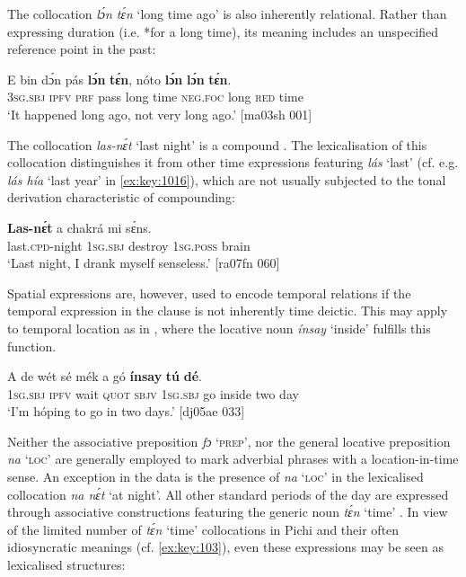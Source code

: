 The collocation \textit{lɔ́n tɛ́n} ‘long time ago’ is also inherently relational. Rather than expressing duration (i.e. *for a long time), its meaning includes an unspecified reference point in the past:



\ea%
    \label{ex:key:1017}
    \gll E    bin  dɔ́n  pás  \textbf{lɔ́n}  \textbf{tɛ́n},    nóto  \textbf{lɔ́n}    \textbf{lɔ́n}  \textbf{tɛ́n}.\\
\textsc{3sg.sbj}  \textsc{ipfv}  \textsc{prf}  pass  long  time    \textsc{neg}.\textsc{foc}  long    \textsc{red}  time\\

\glt ‘It happened long ago, not very long ago.’ [ma03sh 001]
\z

The collocation \textit{las-nɛ́t} ‘last night’ is a compound . The lexicalisation of this collocation distinguishes it from other time expressions featuring \textit{lás} ‘last’ (cf. e.g. \textit{lás hía} ‘last year’ in \ref{ex:key:1016}), which are not usually subjected to the tonal derivation characteristic of compounding{\fff}: 


\ea%
    \label{ex:key:1018}
    \gll \textbf{Las-nɛ́t}    a    chakrá  mi    sɛ́ns.\\
last.\textsc{cpd}{}-night  \textsc{1sg.sbj}  destroy  \textsc{1sg.poss}  brain\\

\glt ‘Last night, I drank myself senseless.’ [ra07fn 060]
\z

Spatial expressions are, however, used to encode temporal relations if the temporal expression in the clause is not inherently time deictic. This may apply to temporal location as in , where the locative noun\textit{ ínsay} ‘inside’ fulfills this function. 


\ea%
    \label{ex:key:1019}
    \gll A    de  wét  sé    mék  a    gó  \textbf{ínsay}  \textbf{tú}  \textbf{dé}.\\
\textsc{1sg.sbj}  \textsc{ipfv}  wait  \textsc{quot}    \textsc{sbjv}  \textsc{1sg.sbj}  go  inside  two  day\\

\glt ‘I’m hóping to go in two days.’ [dj05ae 033]
\z

Neither the associative preposition{\fff} \textit{fɔ} ‘\textsc{prep}’, nor the general locative preposition{\fff} \textit{na} ‘\textsc{loc}’ are generally employed to mark adverbial phrases with a location-in-time sense. An exception in the data is the presence of \textit{na} ‘\textsc{loc}’ in the lexicalised collocation \textit{na nɛ́t} ‘at night’{\fff}. All other standard periods of the day are expressed through associative constructions featuring the generic noun{\fff} \textit{tɛ́n} ‘time’ . In view of the limited number of \textit{tɛ́n} ‘time’ collocations in Pichi and their often idiosyncratic meanings (cf. \ref{ex:key:103}), even these expressions may be seen as lexicalised structures:{\fff}


